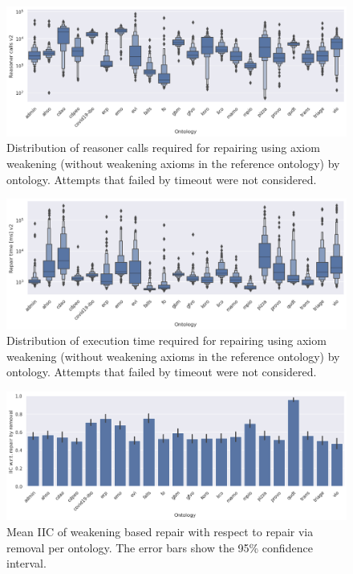 \begin{figure}[htbp]
  \centering
  \includegraphics[width=\textwidth]{resources/calls-enhance-ontology-violin.png}
  \caption{Distribution of reasoner calls required for repairing using axiom weakening (without weakening axioms in the reference ontology) by ontology. Attempts that failed by timeout were not considered.}
\end{figure}

\begin{figure}[htbp]
  \centering
  \includegraphics[width=\textwidth]{resources/time-enhance-ontology-violin.png}
  \caption{Distribution of execution time required for repairing using axiom weakening (without weakening axioms in the reference ontology) by ontology. Attempts that failed by timeout were not considered.}
\end{figure}

\begin{figure}[htbp]
  \centering
  \includegraphics[width=\textwidth]{resources/iic-remove-ontology-bar.png}
  \caption{Mean IIC of weakening based repair with respect to repair via removal per ontology. The error bars show the 95\% confidence interval.}
\end{figure}

